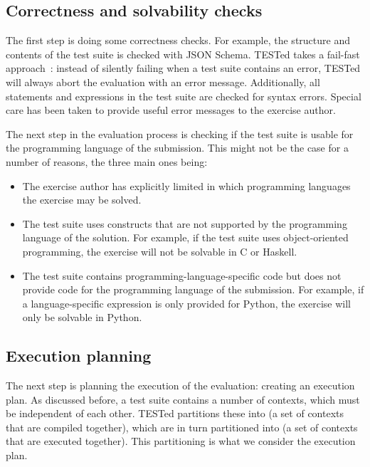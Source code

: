 \documentclass[../main]{subfiles}
\begin{document}
\subsection{Correctness and solvability checks}\label{subsec:solvability-and-correctness-checks}

The first step is doing some correctness checks.
For example, the structure and contents of the test suite is checked with JSON Schema.
TESTed takes a fail-fast approach~\autocite{shoreFailFastSoftware2004}: instead of silently failing when a test suite contains an error, TESTed will always abort the evaluation with an error message.
Additionally, all statements and expressions in the test suite are checked for syntax errors.
Special care has been taken to provide useful error messages to the exercise author.

The next step in the evaluation process is checking if the test suite is usable for the programming language of the submission.
This might not be the case for a number of reasons, the three main ones being:

\begin{itemize}
    \item The exercise author has explicitly limited in which programming languages the exercise may be solved.
    \item The test suite uses constructs that are not supported by the programming language of the solution.
          For example, if the test suite uses object-oriented programming, the exercise will not be solvable in C or Haskell.
    \item The test suite contains programming-language-specific code but does not provide code for the programming language of the submission.
          For example, if a language-specific expression is only provided for Python, the exercise will only be solvable in Python.
\end{itemize}

\subsection{Execution planning}\label{subsec:execution-planning}

The next step is planning the execution of the evaluation: creating an execution plan.
As discussed before, a test suite contains a number of contexts, which must be independent of each other.
TESTed partitions these into  (a set of contexts that are compiled together), which are in turn partitioned into  (a set of contexts that are executed together).
This partitioning is what we consider the execution plan.
\end{document}
